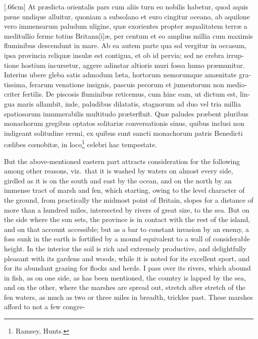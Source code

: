 \documentclass[10pt]{book}
\begin{document}
\begin{paracol}{2}

\begin{otherlanguage}{latin}
[.66cm]
At pr\ae{}dicta orientalis pars cum aliis turn eo nobilis habetur, quod aquis p\ae{}ne undique alluitur, quoniam a subsolano et euro cingitur oceano, ab aquilone vero immensarum paludum uligine, qu\ae{} exorientes propter \ae{}qualitatem terr\ae{} a meditullio ferme totius Britann[i]\ae{}, per centum et eo amplius millia cum maximis fluminibus descendunt in mare. Ab ea autem parte qua sol vergitur in occasum, ipsa provincia reliqu\ae{} insul\ae{} est contigua, et ob id pervia; sed ne crebra irruptione hostium incursetur, aggere adinstar altioris muri fossa humo pr\ae{}munitur. Interius ubere gleba satis admodum l\ae{}ta, hortorum nemorumque am\ae{}nitate gratissima, ferarum venatione insignis, pascuis pecorum et jumentorum non mediocriter fertilis. De piscosis fluminibus reticemus, cum hinc eam, ut dictum est, lingua maris allambit, inde, paludibus dilatatis, stagnorum ad duo vel tria millia spatiosorum innumerabilis multitudo pr\ae{}terfluit. Qu\ae{} paludes pr\ae{}bent pluribus monachorum gregibus optatos solitari\ae{} conversationis sinus, quibus inclusi non indigeant solitudine eremi, ex quibus sunt sancti monachorum patris Benedicti c\ae{}libes c\oe{}nobit\ae{}, in loco\footnote[\textdagger]{Ramsey, Hunts.} celebri hac tempestate.
\end{otherlanguage}

\switchcolumn

But the above-mentioned eastern part attracts consideration for the following among other reasons, viz.\ that it is washed by waters on almost every side, girdled as it is on the south and east by the ocean, and on the north by an immense tract of marsh and fen, which starting, owing to the level character of the ground, from practically the midmost point of Britain, slopes for a distance of more than a hundred miles, intersected by rivers of great size, to the sea. But on the side where the sun sets, the province is in contact with the rest of the island, and on that account accessible; but as a bar to constant invasion by an enemy, a foss sunk in the earth is fortified by a mound equivalent to a wall of considerable height. In the interior the soil is rich and extremely productive, and delightfully pleasant with its gardens and woods, while it is noted for its excellent sport, and for its abundant grazing for flocks and herds. I pass over its rivers, which abound in fish, as on one side, as has been mentioned, the country is lapped by the sea, and on the other, where the marshes are spread out, stretch after stretch of the fen waters, as much as two or three miles in breadth, trickles past. These marshes afford to not a few congre-\linebreak{}

\end{paracol}
\end{document}
